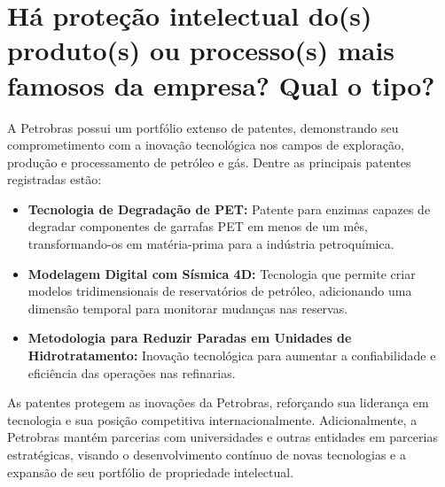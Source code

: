 \section{Há proteção intelectual do(s) produto(s) ou processo(s) mais famosos da empresa? Qual o tipo?}

A Petrobras possui um portfólio extenso de patentes, demonstrando seu comprometimento com a inovação tecnológica nos campos de exploração, produção e processamento de petróleo e gás. Dentre as principais patentes registradas estão:

\begin{itemize}
    \item \textbf{Tecnologia de Degradação de PET:} Patente para enzimas capazes de degradar componentes de garrafas PET em menos de um mês, transformando-os em matéria-prima para a indústria petroquímica.
    \item \textbf{Modelagem Digital com Sísmica 4D:} Tecnologia que permite criar modelos tridimensionais de reservatórios de petróleo, adicionando uma dimensão temporal para monitorar mudanças nas reservas.
    \item \textbf{Metodologia para Reduzir Paradas em Unidades de Hidrotratamento:} Inovação tecnológica para aumentar a confiabilidade e eficiência das operações nas refinarias.
\end{itemize}

As patentes protegem as inovações da Petrobras, reforçando sua liderança em tecnologia e sua posição competitiva internacionalmente. Adicionalmente, a Petrobras mantém parcerias com universidades e outras entidades em parcerias estratégicas, visando o desenvolvimento contínuo de novas tecnologias e a expansão de seu portfólio de propriedade intelectual.
